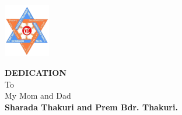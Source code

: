 \begin{center}
	\includegraphics[width=0.15\textwidth]{pictures/tulogo.png}
\end{center}
\begin {center}
\vspace{1.5cm}

{\Large{\bfseries {DEDICATION}}}\\[3cm]

To\\[7mm]
My Mom and Dad\\[4mm]
{\bfseries {\color{blue} Sharada Thakuri and Prem Bdr. Thakuri.}}\\[8mm]
\end {center}

\clearpage